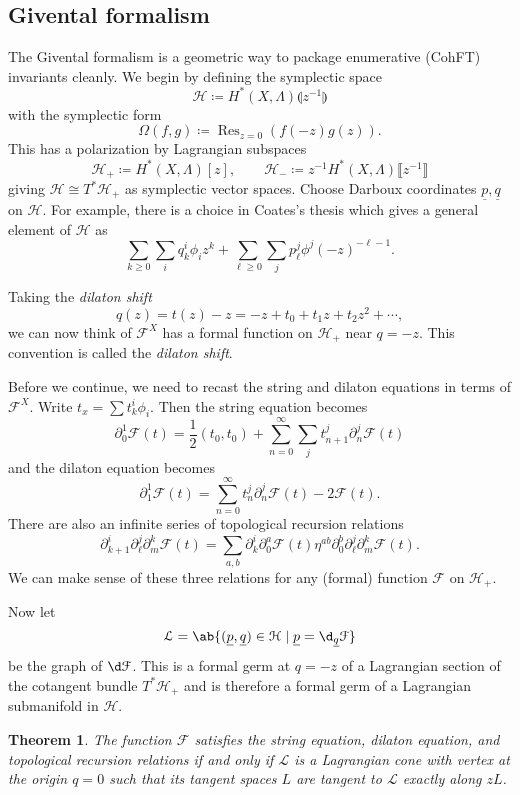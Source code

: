 \documentclass[leqno, openany]{memoir}
\newtheorem{thm}{Theorem}[section]
\theoremstyle{definition}
\theoremstyle{remark}
\theoremstyle{plain}
\theoremstyle{definition}
\theoremstyle{remark}
\newcommand{\mc}[1]{\mathcal{#1}}
\newcommand{\on}[1]{\operatorname{#1}}
\newcommand{\ul}[1]{\underline{#1}}
\begin{document}
\subsection{Givental formalism}

The Givental formalism is a geometric way to package enumerative (CohFT) invariants cleanly. We begin by defining the symplectic space
\[ \mc{H} \coloneqq H^*(X, \Lambda)\llparenthesis z^{-1}\rrparenthesis \]
with the symplectic form
\[ \Omega(f,g) \coloneqq \on{Res}_{z=0} ( f(-z)g(z) ). \]
This has a polarization by Lagrangian subspaces
\[ \mc{H}_+ \coloneqq H^*(X,\Lambda)[z], \qquad \mc{H}_- \coloneqq z^{-1} H^*(X,\Lambda)\llbracket z^{-1} \rrbracket \]
giving $\mc{H} \cong T^* \mc{H}_+$ as symplectic vector spaces. Choose Darboux coordinates $\ul{p}, \ul{q}$ on $\mc{H}$. For example, there is a choice in Coates's thesis which gives a general element of $\mc{H}$ as
\[ \sum_{k \geq 0} \sum_i q_k^i \phi_i z^k + \sum_{\ell \geq 0} \sum_j p_{\ell}^j \phi^j (-z)^{-\ell-1}. \]

Taking the \textit{dilaton shift}
\[ q(z) = t(z) - z = -z + t_0 + t_1 z + t_2 z^2 + \cdots, \]
we can now think of $\mc{F}^X$ has a formal function on $\mc{H}_+$ near $q = -z$. This convention is called the \textit{dilaton shift}.

Before we continue, we need to recast the string and dilaton equations in terms of $\mc{F}^X$. Write $t_x = \sum t_k^i \phi_i$. Then the string equation becomes
\[ \partial_0^1 \mc{F}(t) = \frac{1}{2} (t_0, t_0) + \sum_{n=0}^{\infty} \sum_{j} t_{n+1}^{j} \partial_n^{j} \mc{F}(t) \]
and the dilaton equation becomes
\[ \partial_1^1 \mc{F}(t) = \sum_{n=0}^{\infty} t_n^j \partial_n^j \mc{F}(t) - 2 \mc{F}(t). \]
There are also an infinite series of topological recursion relations
\[ \partial_{k+1}^i \partial_{\ell}^j \partial_{m}^k \mc{F}(t) = \sum_{a,b} \partial_k^i \partial_0^a \mc{F}(t) \eta^{ab} \partial_0^b \partial_{\ell}^j \partial_m^k \mc{F}(t). \]
We can make sense of these three relations for any (formal) function $\mc{F}$ on $\mc{H}_+$.

Now let
\[ \mc{L} = \ab\{(\ul{p}, \ul{q}) \in \mc{H} \mid \ul{p} = \d_{\ul{q}} \mc{F}\} \]
be the graph of $\d \mc{F}$. This is a formal germ at $q=-z$ of a Lagrangian section of the cotangent bundle $T^* \mc{H}_+$ and is therefore a formal germ of a Lagrangian submanifold in $\mc{H}$.

\begin{thm}\label{thm:overruled}
    The function $\mc{F}$ satisfies the string equation, dilaton equation, and topological recursion relations if and only if $\mc{L}$ is a Lagrangian cone with vertex at the origin $q=0$ such that its tangent spaces $L$ are tangent to $\mc{L}$ exactly along $z L$.
\end{thm}
\end{document}
